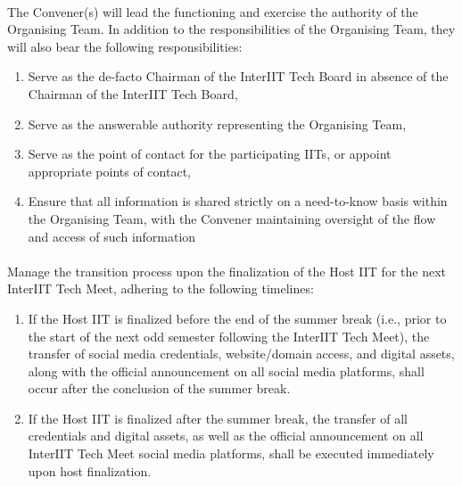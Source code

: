 \paragraph{}
The Convener(s) will lead the functioning and exercise the authority of the Organising Team. In addition to the responsibilities of the Organising Team, they will also bear the following responsibilities:
\begin{enumerate}
    \item Serve as the de-facto Chairman of the InterIIT Tech Board in absence of the Chairman of the InterIIT Tech Board,
    \item Serve as the answerable authority representing the Organising Team,
    \item Serve as the point of contact for the participating IITs, or appoint appropriate points of contact,
    \item Ensure that all information is shared strictly on a need-to-know basis within the Organising Team, with the Convener maintaining oversight of the flow and access of such information
\end{enumerate}

\paragraph{}
Manage the transition process upon the finalization of the Host IIT for the next InterIIT Tech Meet, adhering to the following timelines:
\begin{enumerate}
    \item If the Host IIT is finalized before the end of the summer break (i.e., prior to the start of the next odd semester following the InterIIT Tech Meet), the transfer of social media credentials, website/domain access, and digital assets, along with the official announcement on all social media platforms, shall occur after the conclusion of the summer break.
    \item If the Host IIT is finalized after the summer break, the transfer of all credentials and digital assets, as well as the official announcement on all InterIIT Tech Meet social media platforms, shall be executed immediately upon host finalization.

\end{enumerate}